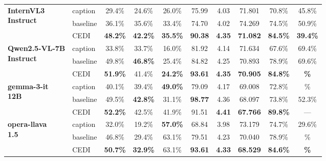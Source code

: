 \begin{table}[t]
\begin{tabular}{@{}l|l|cccccccc@{}}
\multirow{3}{*}{\parbox{2.5cm}{\centering\textbf{InternVL3}\\ \textbf{Instruct}}} & caption & 29.4\% & 24.6\% & 26.0\% & 75.99 & 4.03 & 71.801 & 70.8\% & 45.8\% \\
 & baseline & 36.1\% & 35.6\% & 33.4\% & 74.70 &  4.02 & 74.269 & 74.5\% & 50.9\% \\
\rowcolor[HTML]{E6F2FF}
 \multicolumn{1}{l}{\cellcolor[HTML]{E6F2FF}} & CEDI & \textbf{48.2\%} & \textbf{42.2\%} & \textbf{35.5\%} & \textbf{90.38} & \textbf{4.35} & \textbf{71.082} & \textbf{84.5\%} & \textbf{39.4\%} \\
\midrule

\multirow{3}{*}{\parbox{2.5cm}{\centering\textbf{Qwen2.5-VL-7B}\\ \textbf{Instruct}}} & caption & 33.8\% & 33.7\% & 16.0\% & 81.92 & 4.14 & 71.634 & 67.6\% & 69.4\% \\
 & baseline & 49.8\% & \textbf{46.8\%} & 25.4\% & 84.82 &  4.25 & 70.893 & 78.9\% & 69.6\% \\
\rowcolor[HTML]{E6F2FF}
 \multicolumn{1}{l}{\cellcolor[HTML]{E6F2FF}} & CEDI & \textbf{51.9\%} & 41.4\% & \textbf{24.2\%} & \textbf{93.61} & \textbf{4.35} & \textbf{70.905} & \textbf{84.8\%} & \textbf{\%} \\
\midrule

\multirow{3}{*}{\parbox{2.5cm}{\centering\textbf{gemma-3-it}\\ \textbf{12B}}} & caption & 40.1\% & 39.4\% & \textbf{49.0\%} & 79.09 & 4.17 & 69.008 & 72.8\% & \% \\
 & baseline & 49.5\% & \textbf{42.8\%} & 31.1\% & \textbf{98.77} &  4.36 & 68.097 & 73.8\% & 52.3\% \\
\rowcolor[HTML]{E6F2FF}
 \multicolumn{1}{l}{\cellcolor[HTML]{E6F2FF}} & CEDI & \textbf{52.2\%} & 42.5\% & 41.9\% & 91.51 & \textbf{4.41} & \textbf{67.766} & \textbf{89.8\%} & --- \\
\midrule

\multirow{3}{*}{\parbox{2.5cm}{\centering\textbf{opera-llava}\\ \textbf{1.5}}} & caption & 32.0\% & 19.2\% & \textbf{57.0\%} & 68.84 &  3.98 & 73.179 & 74.7\% & 29.6\% \\
 & baseline & 46.8\% & 29.4\% & 63.1\% & 79.51 & 4.23 & 70.040 & 78.9\% & \% \\
\rowcolor[HTML]{E6F2FF}
 \multicolumn{1}{l}{\cellcolor[HTML]{E6F2FF}} & CEDI & \textbf{50.7\%} & \textbf{32.9\%} & 63.1\% & \textbf{93.61} & \textbf{4.33} & \textbf{68.529} & \textbf{84.6\%} & \textbf{\%} \\
\midrule


\end{tabular}
\end{table}
